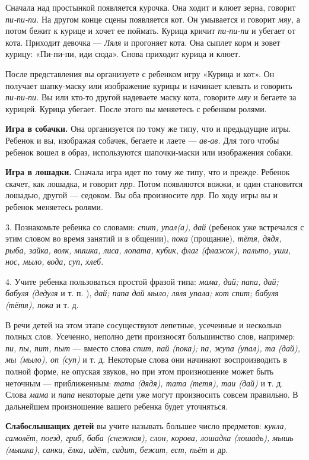 \documentclass[a5paper]{book}
\renewcommand{\emph}[1]{\textit{#1}}
\begin{document}
Сначала над простынкой появляется курочка. Она ходит и клюет зерна,
говорит \emph{пи-пи-пи.} На другом конце сцены появляется кот. Он
умывается и говорит \emph{мяу,} а потом бежит к курице и хочет ее
поймать. Курица кричит \emph{пи-пи-пи} и убегает от кота. Приходит
девочка --- \emph{Ляля} и прогоняет кота. Она сыплет корм и зовет
курицу: «Пи-пи-пи, иди сюда». Снова приходит курица и клюет.

После представления вы организуете с ребенком игру «Курица и кот». Он
получает шапку-маску или изображение курицы и начинает клевать и
говорить \emph{пи-пи-пи.} Вы или кто-то другой надеваете маску кота,
говорите \emph{мяу} и бегаете за курицей. Курица убегает. После этого вы
меняетесь с ребенком ролями.

\textbf{Игра в собачки.} Она организуется по тому же типу, что и
предыдущие игры. Ребенок и вы, изображая собачек, бегаете и лаете ---
\emph{ав-ав.} Для того чтобы ребенок вошел в образ, используются
шапочки-маски или изображения собаки.

\textbf{Игра в лошадки.} Сначала игра идет по тому же типу, что и
прежде. Ребенок скачет, как лошадка, и говорит \emph{прр.} Потом
появляются вожжи, и один становится лошадью, другой --- седоком. Вы оба
произносите \emph{прр.} По ходу игры вы и ребенок меняетесь ролями.

3. Познакомьте ребенка со словами: \emph{спит, упал(а), дай} (ребенок
уже встречался с этим словом во время занятий и в общении), \emph{пока}
(прощание), \emph{тётя, дядя, рыба, зайка, волк, мишка, лиса, лопата,
кубик, флаг (флажок), пальто, уши, нос, мыло, вода, суп, хлеб.}

4. Учите ребенка пользоваться простой фразой типа: \emph{мама, дай;
папа, дай; бабуля (дедуля} и т. п. ), \emph{дай; папа дай мыло; ляля
упала; кот спит; бабуля (тётя), пока} и т. д.

В речи детей на этом этапе сосуществуют лепетные, усеченные и несколько
полных слов. Усеченно, неполно дети произносят большинство слов,
например: \emph{пи, пы, пит, пыт} --- вместо слова \emph{спит, пай
(пока); па, жупа (упал), та (дай), мы (мыло), оп (суп)} и т. д.
Некоторые слова они начинают воспроизводить в полной форме, не опуская
звуков, но при этом произношение может быть неточным --- приближенным:
\emph{тата (дядя), тата (тетя), таи (дай)} и т. д. Слова \emph{мама} и
\emph{папа} некоторые дети уже могут произносить совсем правильно. В
дальнейшем произношение вашего ребенка будет уточняться.

\textbf{Слабослышащих детей} вы учите называть большее число предметов:
\emph{кукла, самолёт, поезд, гриб, баба (снежная), слон, корова, лошадка
(лошадь), мышь (мышка), санки, ёлка, идёт, сидит, бежит, ест, пьёт} и
др.
\end{document}
